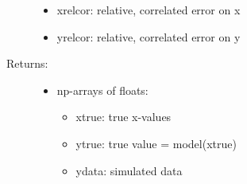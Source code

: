 \documentclass[letterpaper,10pt,english]{sphinxmanual}
\begin{document}
\begin{fulllineitems}
\begin{description}
\begin{itemize}
\item {} 
xrelcor: relative, correlated error on x

\item {} 
yrelcor: relative, correlated error on y

\end{itemize}

\item[{Returns:}] \leavevmode\begin{itemize}
\item {} 
np-arrays of floats:
\begin{itemize}
\item {} 
xtrue: true x-values

\item {} 
ytrue: true value = model(xtrue)

\item {} 
ydata:  simulated data

\end{itemize}

\end{itemize}

\end{description}

\end{fulllineitems}

\end{document}
